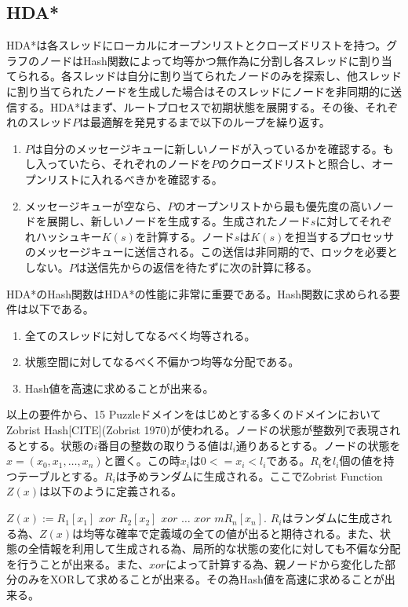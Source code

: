 \documentclass{jsarticle}
\begin{document}
\subsection{HDA*}

HDA*は各スレッドにローカルにオープンリストとクローズドリストを持つ。グラフのノードはHash関数によって均等かつ無作為に分割し各スレッドに割り当てられる。各スレッドは自分に割り当てられたノードのみを探索し、他スレッドに割り当てられたノードを生成した場合はそのスレッドにノードを非同期的に送信する。HDA*はまず、ルートプロセスで初期状態を展開する。その後、それぞれのスレッド$P$は最適解を発見するまで以下のループを繰り返す。


\begin{enumerate}
\item $P$は自分のメッセージキューに新しいノードが入っているかを確認する。もし入っていたら、それぞれのノードを$P$のクローズドリストと照合し、オープンリストに入れるべきかを確認する。

\item メッセージキューが空なら、$P$のオープンリストから最も優先度の高いノードを展開し、新しいノードを生成する。生成されたノード$s$に対してそれぞれハッシュキー$K(s)$を計算する。ノード$s$は$K(s)$を担当するプロセッサのメッセージキューに送信される。この送信は非同期的で、ロックを必要としない。$P$は送信先からの返信を待たずに次の計算に移る。

\end{enumerate}

HDA*のHash関数はHDA*の性能に非常に重要である。Hash関数に求められる要件は以下である。

\begin{enumerate}
\item 全てのスレッドに対してなるべく均等される。
\item 状態空間に対してなるべく不偏かつ均等な分配である。
\item Hash値を高速に求めることが出来る。
\end{enumerate}

以上の要件から、15 Puzzleドメインをはじめとする多くのドメインにおいてZobrist Hash[CITE](Zobrist 1970)が使われる。ノードの状態が整数列で表現されるとする。状態の$i$番目の整数の取りうる値は$l_{i}$通りあるとする。ノードの状態を$x = (x_{0}, x_{1}, …, x_{n})$と置く。この時$x_{i}$は$0 <= x_{i} < l_{i}$である。$R_{i}$を$l_{i}$個の値を持つテーブルとする。$R_{i}$は予めランダムに生成される。ここでZobrist Function $Z(x)$は以下のように定義される。
\newline

$Z(x) := R_{1}[x_{1}]$ $xor$ $R_{2}[x_{2}]$ $xor$ $…$ $xor$ $mR_{n}[x_{n}]$.
\newline
\newline
$R_{i}$はランダムに生成される為、$Z(x)$は均等な確率で定義域の全ての値が出ると期待される。また、状態の全情報を利用して生成される為、局所的な状態の変化に対しても不偏な分配を行うことが出来る。また、$xor$によって計算する為、親ノードから変化した部分のみをXORして求めることが出来る。その為Hash値を高速に求めることが出来る。
\end{document}
